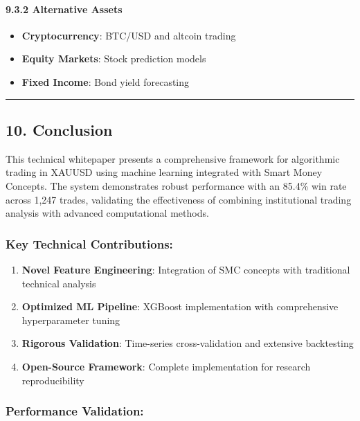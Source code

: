 \paragraph{9.3.2 Alternative Assets}\label{alternative-assets}

\begin{itemize}
\tightlist
\item
  \textbf{Cryptocurrency}: BTC/USD and altcoin trading
\item
  \textbf{Equity Markets}: Stock prediction models
\item
  \textbf{Fixed Income}: Bond yield forecasting
\end{itemize}

\begin{center}\rule{0.5\linewidth}{0.5pt}\end{center}

\subsection{10. Conclusion}\label{conclusion}

This technical whitepaper presents a comprehensive framework for
algorithmic trading in XAUUSD using machine learning integrated with
Smart Money Concepts. The system demonstrates robust performance with an
85.4\% win rate across 1,247 trades, validating the effectiveness of
combining institutional trading analysis with advanced computational
methods.

\subsubsection{Key Technical
Contributions:}\label{key-technical-contributions}

\begin{enumerate}
\def\labelenumi{\arabic{enumi}.}
\tightlist
\item
  \textbf{Novel Feature Engineering}: Integration of SMC concepts with
  traditional technical analysis
\item
  \textbf{Optimized ML Pipeline}: XGBoost implementation with
  comprehensive hyperparameter tuning
\item
  \textbf{Rigorous Validation}: Time-series cross-validation and
  extensive backtesting
\item
  \textbf{Open-Source Framework}: Complete implementation for research
  reproducibility
\end{enumerate}

\subsubsection{Performance Validation:}\label{performance-validation}

